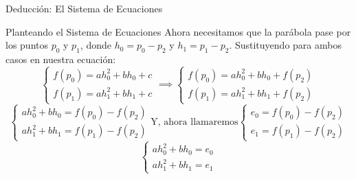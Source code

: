 \documentclass[aspectratio=169, t]{beamer}
\begin{document}
\begin{frame}{Deducción: El Sistema de Ecuaciones}
    \begin{mathstep}{Planteando el Sistema de Ecuaciones}
         Ahora necesitamos que la parábola pase por los puntos $p_0$ y $p_1$, donde $h_0 = p_0 - p_2$ y $h_1 = p_1 - p_2$. Sustituyendo para ambos casos en nuestra ecuación:
        \[ \begin{cases} f(p_0) = a h_0^2 + b h_0 + c \\ f(p_1) = a h_1^2 + b h_1 + c \end{cases} \implies \begin{cases} f(p_0) = a h_0^2 + b h_0 + f(p_2) \\ f(p_1) = a h_1^2 + b h_1 + f(p_2) \end{cases}\]
        \[
        \begin{cases} a h_0^2 + b h_0 = f(p_0) - f(p_2) \\ a h_1^2 + b h_1 = f(p_1) - f(p_2) \end{cases} \text{Y, ahora llamaremos} \begin{cases} e_0 = f(p_0) - f(p_2) \\ e_1 = f(p_1) - f(p_2) \end{cases}
        \]
        \[
        \begin{cases} a h_0^2 + b h_0 = e_0 \\ a h_1^2 + b h_1 = e_1 \end{cases}
        \]
    \end{mathstep}
\end{frame}
\end{document}
